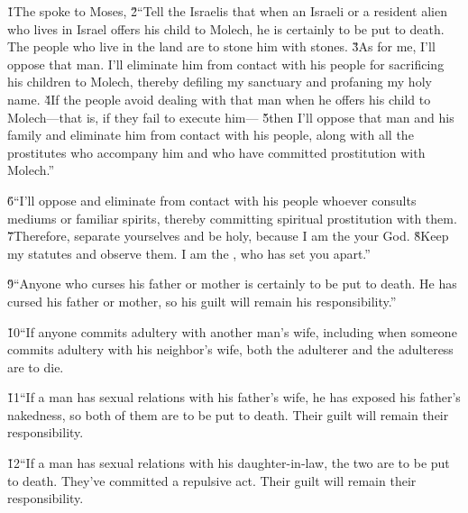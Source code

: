 \v{1}The  spoke to Moses, \v{2}``Tell the Israelis that when an Israeli or a resident alien who lives in Israel offers his child to Molech, he is certainly to be put to death. The people who live in the land are to stone him with stones. \v{3}As for me, I'll oppose that man. I'll eliminate him from contact with his people for sacrificing his children to Molech, thereby defiling my sanctuary and profaning my holy name. \v{4}If the people avoid dealing with that man when he offers his child to Molech---that is, if they fail to execute him--- \v{5}then I'll oppose that man and his family and eliminate him from contact with his people, along with all the prostitutes who accompany him and who have committed prostitution with Molech.''

\v{6}``I'll oppose and eliminate from contact with his people whoever consults mediums or familiar spirits, thereby committing spiritual prostitution with them. \v{7}Therefore, separate yourselves and be holy, because I am the  your God. \v{8}Keep my statutes and observe them. I am the , who has set you apart.''

\v{9}``Anyone who curses his father or mother is certainly to be put to death. He has cursed his father or mother, so his guilt will remain his responsibility.''

\v{10}``If anyone commits adultery with another man's wife, including when someone commits adultery with his neighbor's wife, both the adulterer and the adulteress are to die.

\v{11}``If a man has sexual relations with his father's wife, he has exposed his father's nakedness, so both of them are to be put to death. Their guilt will remain their responsibility.

\v{12}``If a man has sexual relations with his daughter-in-law, the two are to be put to death. They've committed a repulsive act. Their guilt will remain their responsibility.

